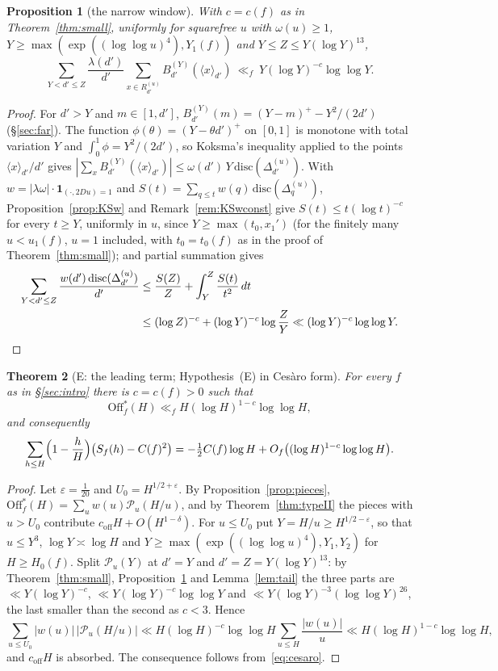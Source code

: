 \documentclass[11pt,a4paper]{article}
\newtheorem{theorem}{Theorem}
\newtheorem{proposition}[theorem]{Proposition}
\theoremstyle{remark}\newtheorem{remark}[theorem]{Remark}
\newcommand{\Off}{\mathrm{Off}}\newcommand{\e}{\mathrm{e}}
\newcommand{\rep}[2]{\langle #1\rangle_{#2}}
\begin{document}
\begin{proposition}[the narrow window]\label{prop:narrow}
With $c=c(f)$ as in Theorem~\ref{thm:small}, uniformly for squarefree $u$ with $\omega(u)\ge1$,
$Y\ge\max(\exp((\log\log u)^4),Y_1(f))$ and $Y\le Z\le Y(\log Y)^{13}$,
\[
\sum_{Y<d'\le Z}\frac{\lambda(d')}{d'}\sum_{x\in R^{(u)}_{d'}}B^{(Y)}_{d'}(\rep x{d'})\ \ll_f\ Y(\log Y)^{-c}\log\log Y.
\]
\end{proposition}
\begin{proof}
For $d'>Y$ and $m\in[1,d']$, $B^{(Y)}_{d'}(m)=(Y-m)^+-Y^2/(2d')$ (\S\ref{sec:far}). The function $\phi(\theta)=(Y-\theta d')^+$ on $[0,1]$ is
monotone with total variation $Y$ and $\int_0^1\phi=Y^2/(2d')$, so Koksma's inequality applied to the points $\rep x{d'}/d'$ gives
$|\sum_xB^{(Y)}_{d'}(\rep x{d'})|\le\omega(d')\,Y\,\mathrm{disc}(\Delta^{(u)}_{d'})$. With $w=|\lambda\omega|\cdot\mathbf 1_{(\cdot,2Du)=1}$ and
$S(t)=\sum_{q\le t}w(q)\,\mathrm{disc}(\Delta^{(u)}_q)$, Proposition~\ref{prop:KSw} and Remark~\ref{rem:KSwconst} give $S(t)\le t(\log t)^{-c}$ for
every $t\ge Y$, uniformly in $u$, since $Y\ge\max(t_0,x_1')$ (for the finitely many $u<u_1(f)$, $u=1$ included, with $t_0=t_0(f)$ as in
the proof of Theorem~\ref{thm:small}); and partial summation gives
\[
\begin{aligned}
\sum_{Y<d'\le Z}\frac{w(d')\,\mathrm{disc}(\Delta^{(u)}_{d'})}{d'}&\le\frac{S(Z)}Z+\int_Y^Z\frac{S(t)}{t^2}\,dt\\
&\le(\log Z)^{-c}+(\log Y)^{-c}\log\frac ZY\ll(\log Y)^{-c}\log\log Y.\qedhere
\end{aligned}
\]
\end{proof}

\begin{theorem}[E: the leading term; Hypothesis~(E) in Ces\`aro form]\label{thm:E}
For every $f$ as in \S\ref{sec:intro} there is $c=c(f)>0$ such that
\[
\Off^\ast_f(H)\ll_fH(\log H)^{1-c}\log\log H,
\]
and consequently
\[
\sum_{h\le H}\Bigl(1-\frac hH\Bigr)\bigl(S_f(h)-C(f)^2\bigr)=-\tfrac12C(f)\log H+O_f\bigl((\log H)^{1-c}\log\log H\bigr).
\]
\end{theorem}
\begin{proof}
Let $\varepsilon=\tfrac1{20}$ and $U_0=H^{1/2+\varepsilon}$. By Proposition~\ref{prop:pieces}, $\Off^\ast_f(H)=\sum_uw(u)\mathcal P_u(H/u)$, and by
Theorem~\ref{thm:typeII} the pieces with $u>U_0$ contribute $c_{\mathrm{off}}H+O(H^{1-\delta})$. For $u\le U_0$ put $Y=H/u\ge H^{1/2-\varepsilon}$, so that
$u\le Y^3$, $\log Y\asymp\log H$ and $Y\ge\max(\exp((\log\log u)^4),Y_1,Y_2)$ for $H\ge H_0(f)$. Split $\mathcal P_u(Y)$ at $d'=Y$ and
$d'=Z=Y(\log Y)^{13}$: by Theorem~\ref{thm:small}, Proposition~\ref{prop:narrow} and Lemma~\ref{lem:tail} the three parts are
$\ll Y(\log Y)^{-c}$, $\ll Y(\log Y)^{-c}\log\log Y$ and $\ll Y(\log Y)^{-3}(\log\log Y)^{26}$, the last smaller than the second as $c<3$. Hence
\[
\sum_{u\le U_0}|w(u)|\,|\mathcal P_u(H/u)|\ll H(\log H)^{-c}\log\log H\sum_{u\le H}\frac{|w(u)|}u\ll H(\log H)^{1-c}\log\log H,
\]
and $c_{\mathrm{off}}H$ is absorbed. The consequence follows from~\eqref{eq:cesaro}.
\end{proof}
\end{document}
